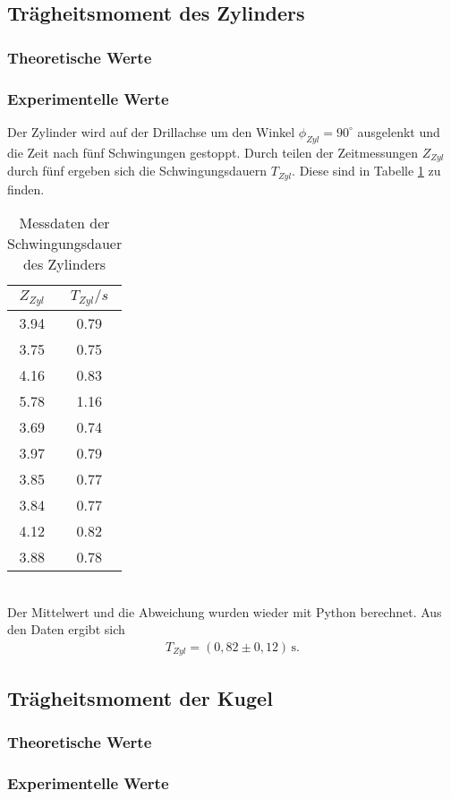 \subsection{Trägheitsmoment des Zylinders}
\subsubsection{Theoretische Werte}

\subsubsection{Experimentelle Werte}
Der Zylinder wird auf der Drillachse um den Winkel $\phi_{Zyl} = 90^{\circ}$ ausgelenkt und die Zeit
nach fünf Schwingungen gestoppt.
Durch teilen der Zeitmessungen $Z_{Zyl}$ durch fünf ergeben sich die Schwingungsdauern $T_{Zyl}$. 
Diese sind in Tabelle \ref{tab:T_Zyl} zu finden.
\begin{table}
  \centering
  \caption{Messdaten der Schwingungsdauer des Zylinders}
  \label{tab:T_Zyl}
  \begin{tabular}{c c}
    \toprule
    $Z_{Zyl}$ & $T_{Zyl}/s$ \\
    \midrule
    3.94 & 0.79 \\
    3.75 & 0.75 \\
    4.16 & 0.83 \\
    5.78 & 1.16 \\
    3.69 & 0.74 \\
    3.97 & 0.79 \\
    3.85 & 0.77 \\
    3.84 & 0.77 \\
    4.12 & 0.82 \\
    3.88 & 0.78 \\
    \bottomrule
  \end{tabular}
\end{table}
\\
Der Mittelwert und die Abweichung wurden wieder mit Python berechnet.
Aus den Daten ergibt sich
\begin{align*}
  T_{Zyl} = (0{,}82 \pm 0{,}12)\, \mathrm{s} .
\end{align*}

\subsection{Trägheitsmoment der Kugel}
\subsubsection{Theoretische Werte}

\subsubsection{Experimentelle Werte}



